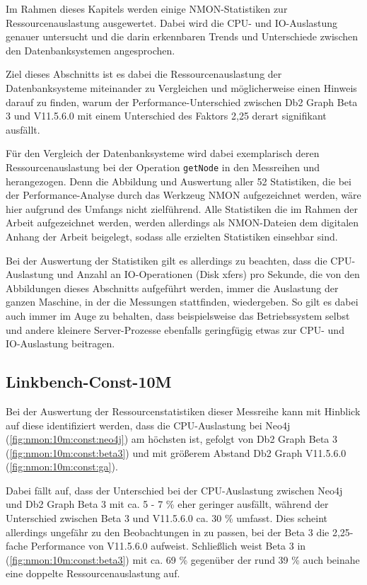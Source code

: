 Im Rahmen dieses Kapitels werden einige NMON-Statistiken zur Ressourcenauslastung ausgewertet. Dabei wird die CPU- und IO-Aus\-last\-ung genauer untersucht und die darin erkennbaren Trends und Unterschiede zwischen den Datenbanksystemen angesprochen. 

Ziel dieses Abschnitts ist es dabei die Ressourcenauslastung der Datenbanksysteme miteinander zu Vergleichen und möglicherweise einen Hinweis darauf zu finden, warum der Performance-Unterschied zwischen Db2 Graph Beta 3 und V11.5.6.0 mit einem Unterschied des Faktors 2,25 derart signifikant ausfällt. 

Für den Vergleich der Datenbanksysteme wird dabei exemplarisch deren Ressourcenauslastung bei der Operation \texttt{getNode} in den Messreihen  und  herangezogen. Denn die Abbildung und Auswertung aller 52 Statistiken, die bei der Performance-Analyse durch das Werkzeug NMON aufgezeichnet werden, wäre hier aufgrund des Umfangs nicht zielführend. Alle Statistiken die im Rahmen der Arbeit aufgezeichnet werden, werden allerdings als NMON-Dateien dem digitalen Anhang der Arbeit beigelegt, sodass alle erzielten Statistiken einsehbar sind.

Bei der Auswertung der Statistiken gilt es allerdings zu beachten, dass die CPU-Auslastung und Anzahl an IO-Ope\-ra\-ti\-on\-en (Disk xfers) pro Sekunde, die von den Abbildungen dieses Abschnitts aufgeführt werden, immer die Auslastung der ganzen Maschine, in der die Messungen stattfinden, wiedergeben. So gilt es dabei auch immer im Auge zu behalten, dass beispielsweise das Betriebssystem selbst und andere kleinere Server-Prozesse ebenfalls geringfügig etwas zur CPU- und IO-Aus\-last\-ung beitragen.  

\subsection{Linkbench-Const-10M}
\label{auswertung:ressourcenauslastung:const}
Bei der Auswertung der Ressourcenstatistiken dieser Messreihe kann mit Hinblick auf diese identifiziert werden, dass die CPU-Auslastung bei Neo4j (\autoref{fig:nmon:10m:const:neo4j}) am höchsten ist, gefolgt von Db2 Graph Beta 3 (\autoref{fig:nmon:10m:const:beta3}) und mit größerem Abstand Db2 Graph V11.5.6.0 (\autoref{fig:nmon:10m:const:ga}). 

Dabei fällt auf, dass der Unterschied bei der CPU-Auslastung zwischen Neo4j und Db2 Graph Beta 3 mit ca. 5 - 7 \% eher geringer ausfällt, während der Unterschied zwischen Beta 3 und V11.5.6.0 ca. 30 \% umfasst. Dies scheint allerdings ungefähr zu den Beobachtungen in  zu passen, bei der Beta 3 die 2,25-fache Performance von V11.5.6.0 aufweist. Schließlich weist Beta 3 in (\autoref{fig:nmon:10m:const:beta3}) mit ca. 69 \% gegenüber der rund 39 \% auch beinahe eine doppelte Ressourcenauslastung auf.

